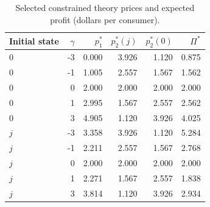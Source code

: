 \begin{table}[htbp]
\centering\small
\caption{Selected constrained theory prices and expected profit (dollars per consumer).}
\label{tab:supply-solutions}
\begin{tabular}{lrrrrr}
\toprule
Initial state & $\gamma$ & $p_1^*$ & $p_2^*(j)$ & $p_2^*(0)$ & $\Pi^*$ \\
\midrule
$0$ & -3 & 0.000 & 3.926 & 1.120 & 0.875 \\
$0$ & -1 & 1.005 & 2.557 & 1.567 & 1.562 \\
$0$ & 0 & 2.000 & 2.000 & 2.000 & 2.000 \\
$0$ & 1 & 2.995 & 1.567 & 2.557 & 2.562 \\
$0$ & 3 & 4.905 & 1.120 & 3.926 & 4.025 \\
$j$ & -3 & 3.358 & 3.926 & 1.120 & 5.284 \\
$j$ & -1 & 2.211 & 2.557 & 1.567 & 2.768 \\
$j$ & 0 & 2.000 & 2.000 & 2.000 & 2.000 \\
$j$ & 1 & 2.271 & 1.567 & 2.557 & 1.838 \\
$j$ & 3 & 3.814 & 1.120 & 3.926 & 2.934 \\
\bottomrule
\end{tabular}
\end{table}
